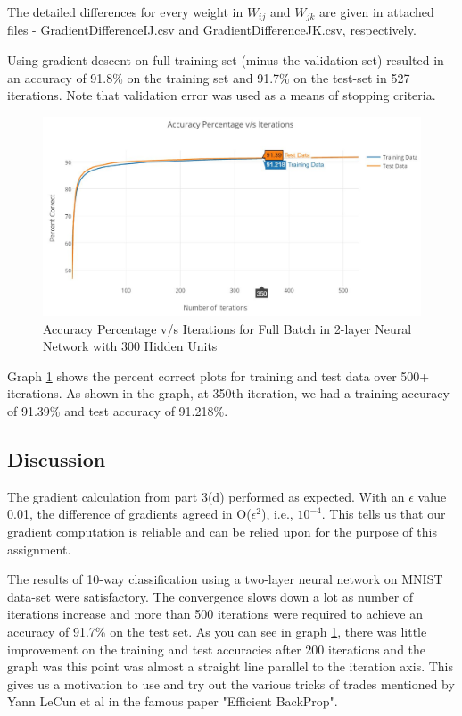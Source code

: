 \documentclass{article}
\begin{document}
The detailed differences for every weight in $W_{ij}$ and $W_{jk}$ are given in attached files - GradientDifferenceIJ.csv and GradientDifferenceJK.csv, respectively.

Using gradient descent on full training set (minus the validation set) resulted in an accuracy of 91.8\% on the training set and 91.7\% on the test-set in 527 iterations. Note that validation error was used as a means of stopping criteria. 
\begin{figure}[h!]
  \includegraphics[width=120mm]{graphs/Q3e_Pt22_fullBatch_500iter_new.JPG}
  \caption{Accuracy Percentage v/s Iterations for Full Batch in 2-layer Neural Network with 300 Hidden Units} 
  \label{fig:3e}
\end{figure}

Graph \ref{fig:3e} shows the percent correct plots for training and test data over 500+ iterations. As shown in the graph, at 350th iteration, we had a training accuracy of 91.39\% and test accuracy of 91.218\%.

\subsection{Discussion}
The gradient calculation from part 3(d) performed as expected. With an $\epsilon$ value 0.01, the difference of gradients agreed in O($\epsilon^2$), i.e., $10^{-4}$. This tells us that our gradient computation is reliable and can be relied upon for the purpose of this assignment. 

The results of 10-way classification using a two-layer neural network on MNIST data-set were satisfactory. The convergence slows down a lot as number of iterations increase and more than 500 iterations were required to achieve an accuracy of 91.7\% on the test set. As you can see in graph \ref{fig:3e}, there was little improvement on the training and test accuracies after 200 iterations and the graph was this point was almost a straight line parallel to the iteration axis. This gives us a motivation to use and try out the various tricks of trades mentioned by Yann LeCun et al in the famous paper "Efficient BackProp".
\newpage
\end{document}
